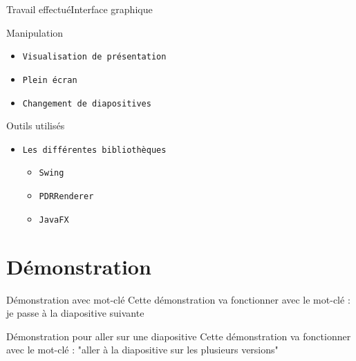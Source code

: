 \documentclass[10pt]{beamer}
\begin{document}
\begin{frame}{Travail effectué}{Interface graphique}
	\begin{block}{Manipulation}
	  	\begin{itemize}
	  		\item {\tt Visualisation de présentation}
	    		\item {\tt Plein écran}
	    		\item {\tt Changement de diapositives}
		\end{itemize}
	\end{block}

	\begin{block}{Outils utilisés}
	  	\begin{itemize}
	    		\item {\tt Les différentes bibliothèques}
	    		\begin{itemize}
	    			\item {\tt Swing}
	    			\item {\tt PDRRenderer}
	    			\item {\tt JavaFX}
	    		\end{itemize}	    		
		\end{itemize}
	\end{block}		  			
\end{frame}

\section{Démonstration}
\begin{frame}{Démonstration avec mot-clé}
	Cette démonstration va fonctionner avec le mot-clé : je passe à la diapositive suivante		
\end{frame}

\begin{frame}{Démonstration pour aller sur une diapositive}
	Cette démonstration va fonctionner avec le mot-clé : "aller à la diapositive sur les plusieurs versions"		
\end{frame}
\end{document}
